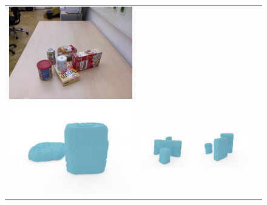 \documentclass[10pt,twocolumn,letterpaper]{article}
\begin{document}
\begin{figure}
\begin{tabular}{cccc}
    \includegraphics[width=\scenewidth]{scene/image_color/test45} \\
    \includegraphics[width=\scenewidth]{scene/cropped/learn12_op_0} &
    \includegraphics[width=\scenewidth]{scene/cropped/test11_op_0} &
    \includegraphics[width=\scenewidth]{scene/cropped/learn13_op_0} &

\end{tabular}
\end{figure}
\end{document}
